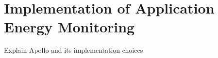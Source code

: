 \chapter{Implementation of Application Energy Monitoring}
\label{chapter:implementation}

Explain Apollo and its implementation choices
